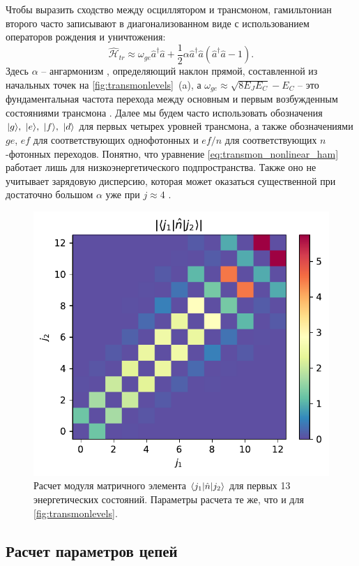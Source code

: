 \documentclass[14pt, a4paper]{extreport}
\DeclarePairedDelimiter\bra{\langle}{\rvert}
\DeclarePairedDelimiter\ket{\lvert}{\rangle}
\numberwithin{equation}{section}
\begin{document}
Чтобы выразить сходство между осциллятором и трансмоном, гамильтониан второго часто записывают в диагонализованном виде с использованием операторов рождения и уничтожения:
\begin{equation}
	\hat{\mathcal{H}}_{tr} \approx \omega_{ge} \hat a^\dag \hat a + \frac{1}{2}\alpha \hat a^\dag \hat a(\hat a^\dag \hat a - 1).\label{eq:transmon_nonlinear_ham}
\end{equation}
Здесь $\alpha$ -- ангармонизм \cite{koch2007charge}, определяющий наклон прямой, составленной из начальных точек на \autoref{fig:transmonlevels}~(a), а $\omega_{ge} \approx \sqrt{8 E_J E_C} - E_C$ -- это фундаментальная частота перехода между основным и первым возбужденным состояниями трансмона \cite{dykman1984theory}. Далее мы будем часто использовать обозначения $\ket{g},\ \ket{e},\ \ket{f},\ \ket{d}$ для первых четырех уровней трансмона, а также обозначениями $ge$, $ef$ для соответствующих однофотонных и $ef/n$ для соответствующих $n$-фотонных переходов. Понятно, что уравнение \eqref{eq:transmon_nonlinear_ham} работает лишь для низкоэнергетического подпространства. Также оно не учитывает зарядовую дисперсию, которая может оказаться существенной при достаточно большом $\alpha$ уже при $j \approx 4$ \cite{peterer2015coherence}.


\begin{figure}
	\centering
	\includegraphics[width=0.5\linewidth]{Pictures/transmon_n_melements}
	\caption{Расчет модуля матричного элемента $\bra{j_1} \hat n \ket{j_2}$ для первых 13 энергетических состояний. Параметры расчета те же, что и для \autoref{fig:transmonlevels}.}
	\label{fig:transmonnmelements}
\end{figure}


\subsection{Расчет параметров цепей}
\end{document}
